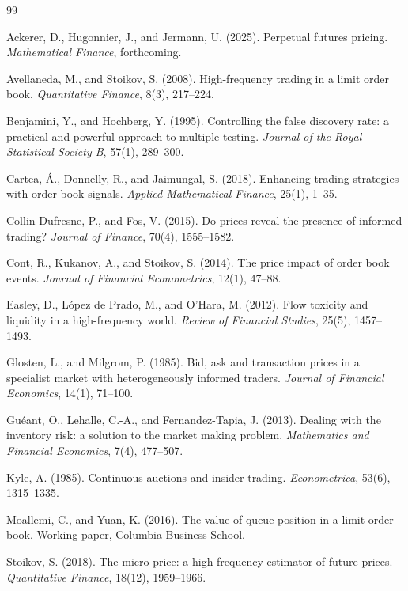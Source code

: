 \documentclass[11pt,a4paper]{article}
\theoremstyle{definition}
\theoremstyle{plain}
\begin{document}
\begin{thebibliography}{99}
\setlength{\itemsep}{2pt}

Ackerer, D., Hugonnier, J., and Jermann, U. (2025).
Perpetual futures pricing. \emph{Mathematical Finance}, forthcoming.

Avellaneda, M., and Stoikov, S. (2008).
High-frequency trading in a limit order book.
\emph{Quantitative Finance}, 8(3), 217--224.

Benjamini, Y., and Hochberg, Y. (1995).
Controlling the false discovery rate: a practical and powerful
approach to multiple testing.
\emph{Journal of the Royal Statistical Society B}, 57(1), 289--300.

Cartea, \'A., Donnelly, R., and Jaimungal, S. (2018).
Enhancing trading strategies with order book signals.
\emph{Applied Mathematical Finance}, 25(1), 1--35.

Collin-Dufresne, P., and Fos, V. (2015).
Do prices reveal the presence of informed trading?
\emph{Journal of Finance}, 70(4), 1555--1582.

Cont, R., Kukanov, A., and Stoikov, S. (2014).
The price impact of order book events.
\emph{Journal of Financial Econometrics}, 12(1), 47--88.

Easley, D., L\'opez de Prado, M., and O'Hara, M. (2012).
Flow toxicity and liquidity in a high-frequency world.
\emph{Review of Financial Studies}, 25(5), 1457--1493.

Glosten, L., and Milgrom, P. (1985).
Bid, ask and transaction prices in a specialist market with
heterogeneously informed traders.
\emph{Journal of Financial Economics}, 14(1), 71--100.

Gu\'eant, O., Lehalle, C.-A., and Fernandez-Tapia, J. (2013).
Dealing with the inventory risk: a solution to the market making
problem. \emph{Mathematics and Financial Economics}, 7(4), 477--507.

Kyle, A. (1985).
Continuous auctions and insider trading.
\emph{Econometrica}, 53(6), 1315--1335.

Moallemi, C., and Yuan, K. (2016).
The value of queue position in a limit order book.
Working paper, Columbia Business School.

Stoikov, S. (2018).
The micro-price: a high-frequency estimator of future prices.
\emph{Quantitative Finance}, 18(12), 1959--1966.

\end{thebibliography}
\end{document}
